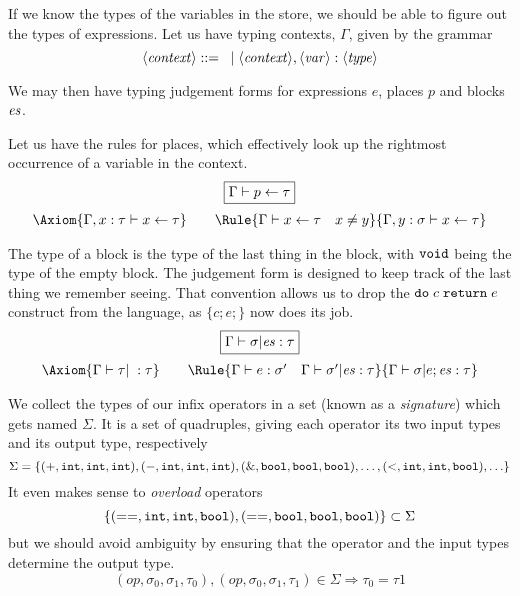 \documentclass{article}
\begin{document}
If we know the types of the variables in the store, we should be able
to figure out the types of expressions. Let us have typing contexts, $\Gamma$,
given by the grammar
\[
  \langle \mathit{context} \rangle ::= \; \;|\; \langle \mathit{context} \rangle, \langle \mathit{var} \rangle : \langle \mathit{type} \rangle
\]

We may then have typing judgement forms for expressions $e$, places $p$
and blocks $\mathit{es}$.

Let us have the rules for places, which effectively look up the rightmost occurrence of a variable in the context.
\[\begin{array}{c}
    \fbx{\JPl \Gamma p\tau} \medskip \\

    \Axiom{\JPl{\Gamma,x:\tau} x\tau} \qquad
    \Rule{\JPl \Gamma x\tau \quad x\neq y}
         {\JPl{\Gamma,y:\sigma}x\tau}
  \end{array}  \]

The type of a block is the type of the last thing in the block, with $\mathtt{void}$ being the type of the empty block. The judgement form is designed to keep track of the last thing we remember seeing. That convention allows us to drop the $\mathtt{do}\;c\;\mathtt{return}\;e$
construct from the language, as $\{c;e;\}$ now does its job.
\[\begin{array}{c}
    \fbx{\JBl\Gamma\sigma\es\tau} \medskip \\

    \Axiom{\JBl\Gamma\tau\;\tau} \qquad
    \Rule{\JEx\Gamma e{\sigma'} \quad \JBl\Gamma{\sigma'}\es\tau}
         {\JBl\Gamma\sigma{e; \es}\tau}
  \end{array}  \]

We collect the types of our infix operators in a set (known as a \emph{signature})
which gets named $\Sigma$. It is a set of quadruples, giving each operator its
two input types and its output type, respectively
\[\Sigma = \{(\mathtt{+},\mathtt{int},\mathtt{int},\mathtt{int}),(\mathtt{-},\mathtt{int},\mathtt{int},\mathtt{int}),
  (\mathtt{\&},\mathtt{bool},\mathtt{bool},\mathtt{bool}),\ldots,
  (\mathtt{<},\mathtt{int},\mathtt{int},\mathtt{bool}),\ldots\}
\]
It even makes sense to \emph{overload} operators
\[
  \{(\mathtt{==},\mathtt{int},\mathtt{int},\mathtt{bool}),(\mathtt{==},\mathtt{bool},\mathtt{bool},\mathtt{bool})\}\subset\Sigma
\]
but we should avoid ambiguity by ensuring that the operator and the input types
determine the output type.
\[
  (\mathit{op},\sigma_0,\sigma_1,\tau_0), (\mathit{op},\sigma_0,\sigma_1,\tau_1)
  \in\Sigma \Rightarrow \tau_0 = \tau1
  \]
\end{document}
